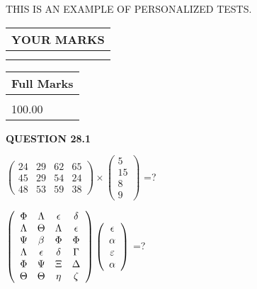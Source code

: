 \documentclass[12pt]{article}
\begin{document}
   
 \vspace{0.2in}
{\Huge  THIS IS AN EXAMPLE OF}
{\Huge  PERSONALIZED TESTS. }
   
   
  
\vspace{0.2in}
  
\noindent\begin{tabular}{|l|}
\hline
 YOUR MARKS  \\
\hline
 \\ 
 \\ 
\hline
\end{tabular}
\hspace{0.05in} \begin{tabular}{|l|}
\hline
 Full Marks  \\
\hline
 \\ 
100.00 \\
\hline
\end{tabular}
{\textbf{\Large{QUESTION
28.1 
}}}
  
  
 
$ \left( \begin{array}{ccccccccc}
 24  & 
 29  & 
 62  & 
 65  \\ 
 45  & 
 29  & 
 54  & 
 24  \\ 
 48  & 
 53  & 
 59  & 
 38
\end{array}\right) \times
\left( \begin{array}{c}
 5  \\ 
 15  \\ 
 8  \\ 
 9
\end{array}\right) $ =?
 
 
$  %
 \left( \begin{array}
 {
 c
 c
 c
 c
 }
 \Phi & 
 \Lambda & 
 \epsilon & 
 \delta \\ 
 \Lambda & 
 \Theta & 
 \Lambda & 
 \epsilon \\ 
 \Psi & 
 \beta & 
 \Phi & 
 \Phi \\ 
 \Lambda & 
 \epsilon & 
 \delta & 
 \Gamma \\ 
 \Phi & 
 \Psi & 
                    \Xi & 
 \Delta \\ 
 \Theta & 
 \Theta & 
 \eta & 
                    \zeta
 \end{array} \right)
 \left( \begin{array}
 {
 c
 }
 \epsilon \\ 
 \alpha \\ 
 \varepsilon \\ 
 \alpha
 \end{array} \right)
$ =?
 
\end{document}
